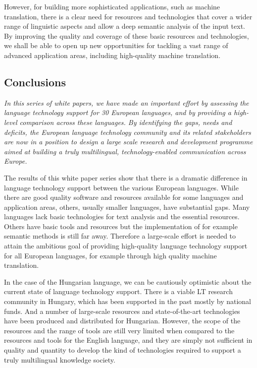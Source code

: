 \begin{multicols}{2}
  However, for building more sophisticated applications, such as machine translation, there is a clear need for resources and technologies that cover a wider range of linguistic aspects and allow a deep semantic analysis of the input text. By improving the quality and coverage of these basic resources and technologies, we shall be able to open up new opportunities for tackling a vast range of advanced application areas, including high-quality machine translation.

  \subsection{Conclusions}

  \emph{In this series of white papers, we have made an important effort by assessing the language technology support for 30 European languages, and by providing a high-level comparison across these languages. By identifying the gaps, needs and deficits, the European language technology community and its related stakeholders are now in a position to design a large scale research and development programme aimed at building a truly multilingual, technology-enabled communication across Europe.}

  The results of this white paper series show that there is a dramatic difference in language technology support between the various European languages. While there are good quality software and resources available for some languages and application areas, others, usually smaller languages, have substantial gaps. Many languages lack basic technologies for text analysis and the essential resources. Others have basic tools and resources but the implementation of for example semantic methods is still far away. Therefore a large-scale effort is needed to attain the ambitious goal of providing high-quality language technology support for all European languages, for example through high quality machine translation. 

  In the case of the Hungarian language, we can be cautiously optimistic about the current state of language technology support. There is a viable LT research community in Hungary, which has been supported in the past mostly by national funds. And a number of large-scale resources and state-of-the-art technologies have been produced and distributed for Hungarian. However, the scope of the resources and the range of tools are still very limited when compared to the resources and tools for the English language, and they are simply not sufficient in quality and quantity to develop the kind of technologies required to support a truly multilingual knowledge society.


\end{multicols}
